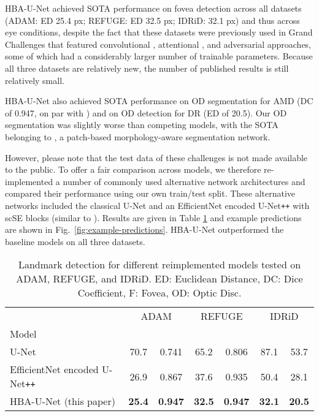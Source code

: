 \documentclass[hidelinks,runningheads]{llncs}
\begin{document}
HBA-U-Net achieved \ac{SOTA} performance on fovea detection across all datasets  (ADAM: \ac{ED} 25.4 px; REFUGE: \ac{ED} 32.5 px; IDRiD: 32.1 px) and thus across eye conditions, despite the fact that these datasets were previously used in Grand Challenges that featured convolutional \cite{kamble_optic_2020}, attentional \cite{zhang_et-net_2019}, and adversarial \cite{wang_patch-based_2019} approaches, some of which had a considerably larger number of trainable parameters.
Because all three datasets are relatively new, the number of published results is still relatively small.


HBA-U-Net also achieved \ac{SOTA} performance on \ac{OD} segmentation for \ac{AMD} (\ac{DC} of 0.947, on par with \cite{kamble_optic_2020}) and on \ac{OD} detection for \ac{DR} (\ac{ED} of 20.5).
Our \ac{OD} segmentation was slightly worse than competing models, with the \ac{SOTA} belonging to \cite{wang_patch-based_2019}, a patch-based morphology-aware segmentation network.







However, please note that the test data of these challenges is not made available to the public.
To offer a fair comparison across models, we therefore re-implemented a number of commonly used alternative network architectures and compared their performance using our own train/test split. These alternative networks included the classical U-Net \cite{ronneberger_u-net_2015} and an EfficientNet \cite{tan_efficientnet_2020} encoded U-Net\verb!++! with scSE blocks (similar to \cite{kamble_optic_2020}). Results are given in Table \ref{tab:reimplemented_models} and example predictions are shown in Fig.~\ref{fig:example-predictions}. HBA-U-Net outperformed the baseline models on all three datasets.





\begin{table}[t!]
    \caption{Landmark detection for different reimplemented models tested on ADAM, REFUGE, and IDRiD.
ED: Euclidean Distance, DC: Dice Coefficient, F: Fovea, OD: Optic Disc.}
    \centering
    \setlength\tabcolsep{4pt}
    \def\arraystretch{1.2}\begin{tabularx}{\textwidth}{X|cc|cc|cc}
    &  \multicolumn{2}{c|}{ADAM} & \multicolumn{2}{c|}{REFUGE} & \multicolumn{2}{c}{IDRiD} \\
    Model &   &  &  &  &  &  \\ \hline
    U-Net \cite{ronneberger_u-net_2015}  & 70.7 & 0.741 &  65.2 &  0.806&  87.1&   53.7\\
    EfficientNet encoded U-Net\texttt{++} \cite{kamble_optic_2020}
    & 26.9 & 0.867 &  37.6&  0.935&  50.4&  28.1\\
    HBA-U-Net (this paper) & {\bf 25.4} & {\bf 0.947}  &  {\bf 32.5}& {\bf 0.947}& {\bf 32.1}& {\bf 20.5} 
    \end{tabularx}
    \label{tab:reimplemented_models}
\end{table}
\end{document}
